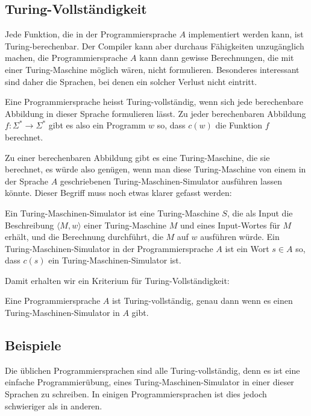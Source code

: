 \subsection{Turing-Vollständigkeit}
Jede Funktion, die in der Programmiersprache $A$ implementiert werden
kann, ist Turing-berechenbar.
Der Compiler kann
aber durchaus Fähigkeiten unzugänglich machen, die Programmiersprache
$A$ kann dann gewisse Berechnungen, die mit einer Turing-Maschine
möglich wären, nicht formulieren. Besonderes interessant sind daher
die Sprachen, bei denen ein solcher Verlust nicht eintritt.

\begin{definition}
%
Eine Programmiersprache heisst Turing-vollständig, wenn sich jede
berechenbare Abbildung in dieser Sprache formulieren lässt.
Zu jeder berechenbaren Abbildung $f\colon\Sigma^*\to \Sigma^*$ gibt
es also ein Programm $w$ so, dass $c(w)$ die Funktion $f$ berechnet.
\end{definition}

Zu einer berechenbaren Abbildung gibt es eine Turing-Maschine, die
sie berechnet, es würde also genügen, wenn man diese Turing-Maschine
von einem in der Sprache $A$ geschriebenen Turing-Maschinen-Simulator
ausführen lassen könnte. Dieser Begriff muss noch etwas klarer gefasst
werden:

\begin{definition}
%
Ein Turing-Maschinen-Simulator ist eine Turing-Maschine $S$, die als Input
die Beschreibung $\langle M,w\rangle$ einer Turing-Maschine $M$ und eines
Input-Wortes für $M$ erhält, und die Berechnung durchführt, die $M$ auf $w$
ausführen würde.
Ein Turing-Maschinen-Simulator in der Programmiersprache $A$ ist
ein Wort $s\in A$ so, dass $c(s)$ ein Turing-Maschinen-Simulator ist.
\end{definition}

Damit erhalten wir ein Kriterium für Turing-Vollständigkeit:

\begin{satz}
\label{turingvollstaendigkeitskriterium}
Eine Programmiersprache $A$ ist Turing-vollständig, genau dann
wenn es einen Turing-Maschinen-Simulator in $A$ gibt.
\end{satz}


\subsection{Beispiele}
Die üblichen Programmiersprachen sind alle Turing-vollständig, denn es
ist eine einfache Programmierübung, eines Turing-Maschinen-Simulator
in einer dieser Sprachen zu schreiben. In einigen Programmiersprachen
ist dies jedoch schwieriger als in anderen.

